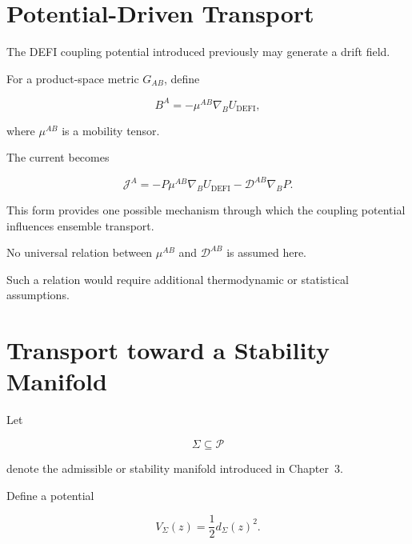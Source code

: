 \documentclass[12pt,oneside]{book}
\newcommand{\DEFI}{\mathrm{DEFI}}
\begin{document}
\section{Potential-Driven Transport}
\label{sec:potential-driven-transport}

The DEFI coupling potential introduced previously may generate a
drift field.

For a product-space metric \(G_{AB}\), define

\begin{equation}
    B^A
    =
    -
    \mu^{AB}
    \nabla_B U_{\DEFI},
    \label{eq:potential-driven-drift}
\end{equation}

where \(\mu^{AB}\) is a mobility tensor.

The current becomes

\begin{equation}
    \mathcal{J}^A
    =
    -
    P
    \mu^{AB}
    \nabla_B U_{\DEFI}
    -
    \mathcal{D}^{AB}
    \nabla_B P.
    \label{eq:potential-diffusive-current}
\end{equation}

This form provides one possible mechanism through which the
coupling potential influences ensemble transport.

No universal relation between \(\mu^{AB}\) and
\(\mathcal{D}^{AB}\) is assumed here.

Such a relation would require additional thermodynamic or
statistical assumptions.


\section{Transport toward a Stability Manifold}
\label{sec:transport-stability-manifold}

Let

\begin{equation}
    \Sigma
    \subseteq
    \mathcal{P}
\end{equation}

denote the admissible or stability manifold introduced in
Chapter~3.

Define a potential

\begin{equation}
    V_{\Sigma}(z)
    =
    \frac{1}{2}
    d_{\Sigma}(z)^2.
    \label{eq:transport-stability-potential}
\end{equation}
\end{document}

